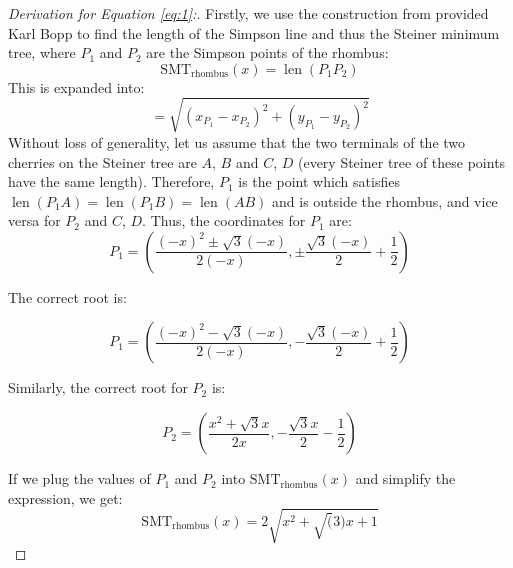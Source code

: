 \documentclass{mpaper}
\begin{document}
\begin{proof} [Derivation for Equation \ref{eq:1}:]

Firstly, we use the construction from provided Karl Bopp \cite{bopp} to find the length of the Simpson line and thus the Steiner minimum tree, where $P_1$ and $P_2$ are the Simpson points of the rhombus:
\[
  \operatorname{SMT_{rhombus}}(x) = \operatorname{len}(P_1P_2)
\]
This is expanded into:
\[
  = \sqrt{(x_{P_1}-x_{P_2})^2+(y_{P_1}-y_{P_2})^2}
\]
Without loss of generality, let us assume that the two terminals of the two cherries on the Steiner tree are $A$, $B$ and $C$, $D$ (every Steiner tree of these points have the same length). Therefore, $P_1$ is the point which satisfies $\operatorname{len}(P_1A)=\operatorname{len}(P_1B)=\operatorname{len}(AB)$ and is outside the rhombus, and vice versa for $P_2$ and $C$, $D$. Thus, the coordinates for $P_1$ are:
\[
  P_1 = \left(\frac{(-x)^{2} \pm \sqrt{3} (-x)}{2 (-x)}, \pm \frac{\sqrt{3} (-x)}{2} + \frac{1}{2}\right)
\]

The correct root is:

\[
  P_1 = \left(\frac{(-x)^{2} - \sqrt{3} (-x)}{2 (-x)}, - \frac{\sqrt{3} (-x)}{2} + \frac{1}{2}\right)
\]

Similarly, the correct root for $P_2$ is:

\[
  P_2 =\left(\frac{x^{2} + \sqrt{3} x}{2 x}, - \frac{\sqrt{3} x}{2} - \frac{1}{2}\right)
\]

If we plug the values of $P_1$ and $P_2$ into $\operatorname{SMT_{rhombus}}(x)$ and simplify the expression, we get:
\[
  \operatorname{SMT_{rhombus}}(x)=2\sqrt{x^2+\sqrt(3)x+1}
\]

  

  
  
\end{proof}
\end{document}
